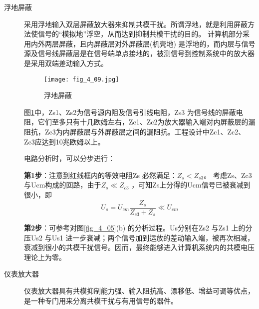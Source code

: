 \begin{description}
  \item[浮地屏蔽]
  采用浮地输入双层屏蔽放大器来抑制共模干扰。所谓浮地，就是利用屏蔽方法使信号的“模拟地”浮空，从而达到抑制共模干扰的目的。
  计算机部分采用内外两层屏蔽，且内屏蔽层对外屏蔽层(机壳地) 是浮地的，而内层与信号源及信号线屏蔽层是在信号端单点接地的，被测信号到控制系统中的放大器是采用双端差动输入方式。

\begin{figure}[h]
  \centering
  \texttt{[image: fig\_4\_09.jpg]}\\
  \caption{浮地屏蔽}\label{fig_4_09}
\end{figure}

  \begin{remark}
  图\ref{fig_4_09}中，Zs1、Zs2为信号源内阻及信号引线电阻，Zs3 为信号线的屏蔽电阻，它们至多只有十几欧姆左右，Zc1、Zc2为放大器输入端对内屏蔽层的漏阻抗，Zc3为内屏蔽层与外屏蔽层之间的漏阻抗。工程设计中Zc1、Zc2、Zc3应达到10兆欧姆以上。
  \end{remark}

  \begin{remark}
  电路分析时，可以分步进行：

  \textbf{第1步}：注意到红线框内的等效电阻Zs 必然满足：$Z_s<Z_{s3}$。 考虑Zs、Zc3与Ucm构成的回路，由于$Z_s \ll Z_{c3}$ ，可知Zs上分得的Ucm信号已被衰减到很小，即
  \begin{equation}
    U_s = U_{cm}\frac{Z_s}{Z_{c3}+Z_s}\ll U_{cm}
  \end{equation}

\textbf{第2步}：可参考对图\ref{fig_4_05}(b) 的分析过程。Us分别在Zs2 与Zs1 上的分压Us2 与Us1 进一步衰减；两个信号加到运放的差动输入端，被再次相减，衰减到很小的共模干扰信号。因而，最终能够进入计算机系统内的共模电压理论上为零。

  \end{remark}

  \item[仪表放大器]
  仪表放大器具有共模抑制能力强、输入阻抗高、漂移低、增益可调等优点，是一种专门用来分离共模干扰与有用信号的器件。
\end{description}

